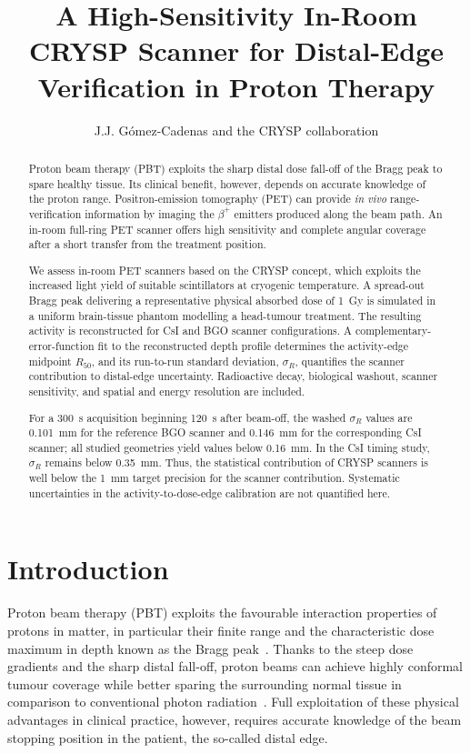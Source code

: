 \documentclass[11pt]{article}
\title{A High-Sensitivity In-Room CRYSP Scanner for Distal-Edge Verification in Proton Therapy}
\author{J.J. Gómez-Cadenas and the CRYSP collaboration}
\date{}
\newcommand{\Rc}{\ensuremath{R_{50}}}
\begin{document}
\maketitle
\vspace{-2em}

\begin{abstract}
Proton beam therapy (PBT) exploits the sharp distal dose fall-off of the Bragg peak to spare healthy tissue. Its clinical benefit, however, depends on accurate knowledge of the proton range. Positron-emission tomography (PET) can provide \emph{in vivo} range-verification information by imaging the $\beta^+$ emitters produced along the beam path. An in-room full-ring PET scanner offers high sensitivity and complete angular coverage after a short transfer from the treatment position.

We assess in-room PET scanners based on the CRYSP concept, which exploits the increased light yield of suitable scintillators at cryogenic temperature. A spread-out Bragg peak delivering a representative physical absorbed dose of \SI{1}{\gray} is simulated in a uniform brain-tissue phantom modelling a head-tumour treatment. The resulting activity is reconstructed for CsI and BGO scanner configurations. A complementary-error-function fit to the reconstructed depth profile determines the activity-edge midpoint \Rc, and its run-to-run standard deviation, $\sigma_R$, quantifies the scanner contribution to distal-edge uncertainty. Radioactive decay, biological washout, scanner sensitivity, and spatial and energy resolution are included.

For a \SI{300}{s} acquisition beginning \SI{120}{s} after beam-off, the washed $\sigma_R$ values are \SI{0.101}{\milli\metre} for the reference BGO scanner and \SI{0.146}{\milli\metre} for the corresponding CsI scanner; all studied geometries yield values below \SI{0.16}{\milli\metre}. In the CsI timing study, $\sigma_R$ remains below \SI{0.35}{\milli\metre}. Thus, the statistical contribution of CRYSP scanners is well below the \SI{1}{\milli\metre} target precision for the scanner contribution. Systematic uncertainties in the activity-to-dose-edge calibration are not quantified here.

\end{abstract}

\section{Introduction}

Proton beam therapy (PBT)
exploits the favourable interaction properties of protons in matter, in
particular their finite range and the characteristic dose maximum in depth
known as the Bragg peak~\cite{Jaekel2020}. Thanks to the steep dose gradients
and the sharp distal fall-off, proton beams can achieve highly conformal
tumour coverage while better sparing the surrounding normal tissue in
comparison to conventional photon radiation~\cite{Jaekel2020}. Full
exploitation of these physical advantages in clinical practice, however,
requires accurate knowledge of the beam stopping position in the patient, the so-called distal edge.
\end{document}
